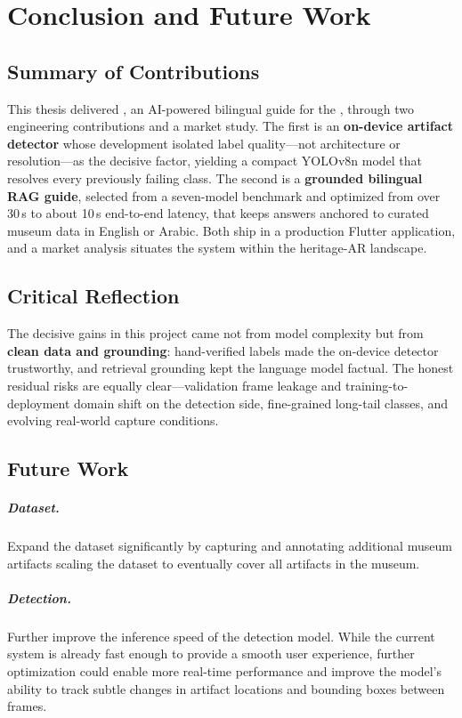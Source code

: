 \chapter{Conclusion and Future Work}

\section{Summary of Contributions}

This thesis delivered \TimeLens{}, an AI-powered bilingual guide for the
\GEM{}, through two engineering contributions and a market study. The first is an
\textbf{on-device artifact detector} whose development isolated label quality---not
architecture or resolution---as the decisive factor, yielding a compact YOLOv8n model
that resolves every previously failing class. The second is a \textbf{grounded
bilingual RAG guide}, selected from a seven-model benchmark and optimized from over
30\,s to about 10\,s end-to-end latency, that keeps answers anchored to curated museum
data in English or Arabic. Both ship in a production Flutter application, and a market
analysis situates the system within the heritage-AR landscape.

\section{Critical Reflection}

The decisive gains in this project came not from model complexity but from
\textbf{clean data and grounding}: hand-verified labels made the on-device detector
trustworthy, and retrieval grounding kept the language model factual. The honest
residual risks are equally clear---validation frame leakage and training-to-deployment
domain shift on the detection side, fine-grained long-tail classes, and evolving
real-world capture conditions.

\section{Future Work}

\paragraph{Dataset.} Expand the dataset significantly by capturing and annotating additional museum artifacts scaling the dataset to eventually cover all artifacts in the museum.

\paragraph{Detection.} Further improve the inference speed of the detection model. While the current system is already fast enough to provide a smooth user experience, further optimization could enable more real-time performance and improve the model's ability to track subtle changes in artifact locations and bounding boxes between frames.

